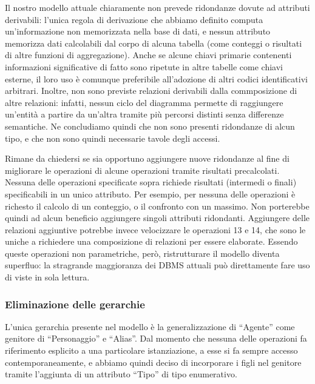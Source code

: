 \documentclass{article}
\begin{document}
Il nostro modello attuale chiaramente non prevede ridondanze dovute ad attributi
derivabili: l'unica regola di derivazione che abbiamo definito computa
un'informazione non memorizzata nella base di dati, e nessun attributo memorizza
dati calcolabili dal corpo di alcuna tabella (come conteggi o risultati di altre
funzioni di aggregazione). Anche se alcune chiavi primarie contenenti
informazioni significative di fatto sono ripetute in altre tabelle come chiavi
esterne, il loro uso è comunque preferibile all'adozione di altri codici
identificativi arbitrari. Inoltre, non sono previste relazioni derivabili dalla
commposizione di altre relazioni: infatti, nessun ciclo del diagramma permette
di raggiungere un'entità a partire da un'altra tramite più percorsi distinti
senza differenze semantiche. Ne concludiamo quindi che non sono presenti
ridondanze di alcun tipo, e che non sono quindi necessarie tavole degli accessi.

Rimane da chiedersi se sia opportuno aggiungere nuove ridondanze al fine di
migliorare le operazioni di alcune operazioni tramite risultati precalcolati.
Nessuna delle operazioni specificate sopra richiede risultati (intermedi o
finali) specificabili in un unico attributo. Per esempio, per nessuna delle
operazioni è richesto il calcolo di un conteggio, o il confronto con un massimo.
Non porterebbe quindi ad alcun beneficio aggiungere singoli attributi
ridondanti. Aggiungere delle relazioni aggiuntive potrebbe invece velocizzare
le operazioni 13 e 14, che sono le uniche a richiedere una composizione di
relazioni per essere elaborate. Essendo queste operazioni non parametriche,
però, ristrutturare il modello diventa superfluo: la stragrande maggioranza dei
DBMS attuali può direttamente fare uso di viste in sola lettura.

\subsubsection{Eliminazione delle gerarchie}

L'unica gerarchia presente nel modello è la generalizzazione di ``Agente'' come
genitore di ``Personaggio'' e ``Alias''. Dal momento che nessuna delle operazioni fa
riferimento esplicito a una particolare istanziazione, a esse si fa sempre
accesso contemporaneamente, e abbiamo quindi deciso di incorporare i figli nel
genitore tramite l'aggiunta di un attributo ``Tipo'' di tipo enumerativo.

\end{document}
